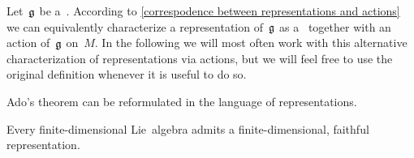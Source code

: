\begin{fluff}
  Let~$\mathfrak{g}$ be a~\liealgebra{$\kf$}.
  According to \cref{correspodence between representations and actions} we can equivalently characterize a representation of~$\mathfrak{g}$ as a~\vectorspace{$\kf$} together with an action of~$\mathfrak{g}$ on~$M$.
  In the following we will most often work with this alternative characterization of representations via actions, but we will feel free to use the original definition whenever it is useful to do so.
\end{fluff}




\begin{fluff}
  Ado’s theorem can be reformulated in the language of representations.
\end{fluff}


\begin{theorem}
  Every finite-dimensional Lie~algebra admits a finite-\hspace{0pt}dimensional, faithful representation.
\end{theorem}


